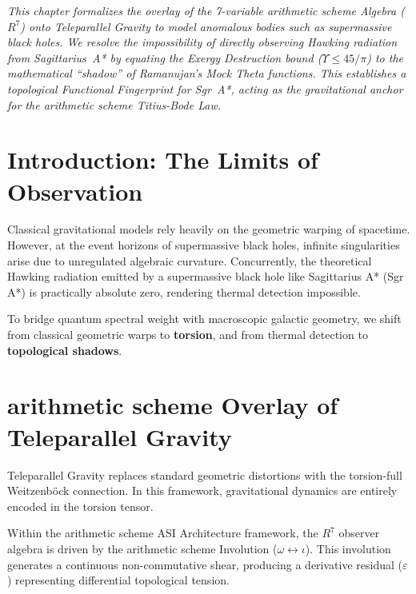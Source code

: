 \noindent\textit{This chapter formalizes the overlay of the 7-variable arithmetic scheme Algebra ($R^7$) onto Teleparallel Gravity to model anomalous bodies such as supermassive black holes. We resolve the impossibility of directly observing Hawking radiation from Sagittarius~A* by equating the Exergy Destruction bound ($\Upsilon \leq 45/\pi$) to the mathematical ``shadow'' of Ramanujan's Mock Theta functions. This establishes a topological Functional Fingerprint for Sgr~A*, acting as the gravitational anchor for the arithmetic scheme Titius-Bode Law.}
\bigskip

\section{Introduction: The Limits of Observation}
Classical gravitational models rely heavily on the geometric warping of spacetime. However, at the event horizons of supermassive black holes, infinite singularities arise due to unregulated algebraic curvature. Concurrently, the theoretical Hawking radiation emitted by a supermassive black hole like Sagittarius A* (Sgr A*) is practically absolute zero, rendering thermal detection impossible.

To bridge quantum spectral weight with macroscopic galactic geometry, we shift from classical geometric warps to \textbf{torsion}, and from thermal detection to \textbf{topological shadows}.

\section{arithmetic scheme Overlay of Teleparallel Gravity}
Teleparallel Gravity replaces standard geometric distortions with the torsion-full Weitzenb\"ock connection. In this framework, gravitational dynamics are entirely encoded in the torsion tensor.

Within the arithmetic scheme ASI Architecture framework, the $R^7$ observer algebra is driven by the arithmetic scheme Involution ($\omega \leftrightarrow \iota$). This involution generates a continuous non-commutative shear, producing a derivative residual ($\varepsilon$) representing differential topological tension.

